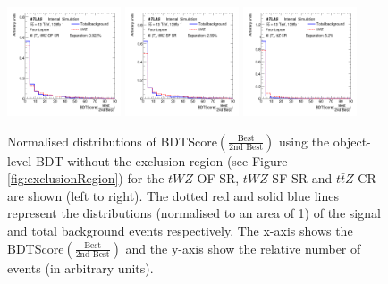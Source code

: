 \begin{figure}
    \centering
    \includegraphics[width=0.3\textwidth]{figures/bdtPlots/lep4_tWZ_4T_OF_BDT_Score_bestOver2ndBest_sep.png}
    \includegraphics[width=0.3\textwidth]{figures/bdtPlots/lep4_tWZ_4T_SF_BDT_Score_bestOver2ndBest_sep.png}
    \includegraphics[width=0.3\textwidth]{figures/bdtPlots/lep4_ttZ_4T_BDT_Score_bestOver2ndBest_sep.png}
    \caption{Normalised distributions of BDTScore$(\frac{\text{Best}}{\text{2nd Best}})$ using the object-level BDT without the exclusion region (see Figure \ref{fig:exclusionRegion}) for the $tWZ$ OF SR, $tWZ$ SF SR and $t\bar{t}Z$ CR are shown (left to right). The dotted red and solid blue lines represent the distributions (normalised to an area of 1) of the signal and total background events respectively. The x-axis shows the BDTScore$(\frac{\text{Best}}{\text{2nd Best}})$ and the y-axis show the relative number of events (in arbitrary units).}
    \label{fig:exclusionRegion-normplots}
\end{figure}

